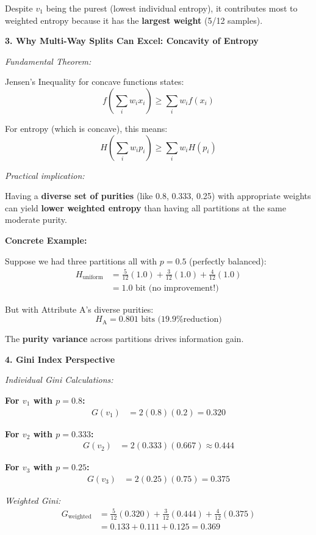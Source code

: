 \documentclass[12pt]{article}
\begin{document}
\begin{explanation}
Despite $v_1$ being the purest (lowest individual entropy), it contributes most to weighted entropy because it has the \textbf{largest weight} (5/12 samples).

\textbf{3. Why Multi-Way Splits Can Excel: Concavity of Entropy}

\textit{Fundamental Theorem:}

Jensen's Inequality for concave functions states:
\[
f\left(\sum_i w_i x_i\right) \geq \sum_i w_i f(x_i)
\]

For entropy (which is concave), this means:
\[
H\left(\sum_i w_i p_i\right) \geq \sum_i w_i H(p_i)
\]

\textit{Practical implication:}

Having a \textbf{diverse set of purities} (like 0.8, 0.333, 0.25) with appropriate weights can yield \textbf{lower weighted entropy} than having all partitions at the same moderate purity.

\textbf{Concrete Example:}

Suppose we had three partitions all with $p = 0.5$ (perfectly balanced):
\begin{align*}
H_{\text{uniform}} &= \frac{5}{12}(1.0) + \frac{3}{12}(1.0) + \frac{4}{12}(1.0) \\
&= 1.0 \text{ bit (no improvement!)}
\end{align*}

But with Attribute A's diverse purities:
\[
H_{\text{A}} = 0.801 \text{ bits (19.9\% reduction)}
\]

The \textbf{purity variance} across partitions drives information gain.

\textbf{4. Gini Index Perspective}

\textit{Individual Gini Calculations:}

\textbf{For $v_1$ with $p = 0.8$:}
\begin{align*}
G(v_1) &= 2(0.8)(0.2) = 0.320
\end{align*}

\textbf{For $v_2$ with $p = 0.333$:}
\begin{align*}
G(v_2) &= 2(0.333)(0.667) \approx 0.444
\end{align*}

\textbf{For $v_3$ with $p = 0.25$:}
\begin{align*}
G(v_3) &= 2(0.25)(0.75) = 0.375
\end{align*}

\textit{Weighted Gini:}
\begin{align*}
G_{\text{weighted}} &= \frac{5}{12}(0.320) + \frac{3}{12}(0.444) + \frac{4}{12}(0.375) \\
&= 0.133 + 0.111 + 0.125 = 0.369
\end{align*}


\end{explanation}
\end{document}
